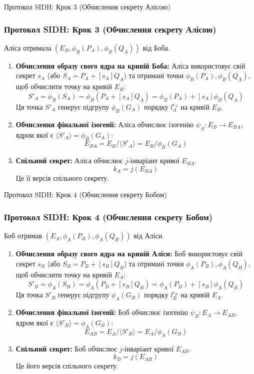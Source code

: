 \documentclass[9pt]{beamer}
\begin{document}
\begin{darkframes}

\begin{frame}{Протокол SIDH: Крок 3 (Обчислення секрету Алісою)}
  \frametitle{Протокол SIDH: Крок 3 (Обчислення секрету Алісою)}
  Аліса отримала $(E_B, \phi_B(P_A), \phi_B(Q_A))$ від Боба.
  \begin{enumerate}
    \item \textbf{Обчислення образу свого ядра на кривій Боба:} Аліса використовує свій секрет $s_A$ (або $S_A = P_A + [s_A] Q_A$) та отримані точки $\phi_B(P_A), \phi_B(Q_A)$, щоб обчислити точку на кривій $E_B$:
    $$ S'_A = \phi_B(S_A) = \phi_B(P_A + [s_A] Q_A) = \phi_B(P_A) + [s_A] \phi_B(Q_A) $$
    Ця точка $S'_A$ генерує підгрупу $\phi_B(G_A)$ порядку $l_A^{e_A}$ на кривій $E_B$.
    \item \textbf{Обчислення фінальної ізогенії:} Аліса обчислює ізогенію $\psi_A: E_B \to E_{BA}$, ядром якої є $\langle S'_A \rangle = \phi_B(G_A)$:
    $$ E_{BA} = E_B / \langle S'_A \rangle = E_B / \phi_B(G_A) $$
    \item \textbf{Спільний секрет:} Аліса обчислює $j$-інваріант кривої $E_{BA}$.
    $$ k_A = j(E_{BA}) $$
    Це її версія спільного секрету.
  \end{enumerate}
\end{frame}


\begin{frame}{Протокол SIDH: Крок 4 (Обчислення секрету Бобом)}
  \frametitle{Протокол SIDH: Крок 4 (Обчислення секрету Бобом)}
  Боб отримав $(E_A, \phi_A(P_B), \phi_A(Q_B))$ від Аліси.
  \begin{enumerate}
    \item \textbf{Обчислення образу свого ядра на кривій Аліси:} Боб використовує свій секрет $s_B$ (або $S_B = P_B + [s_B] Q_B$) та отримані точки $\phi_A(P_B), \phi_A(Q_B)$, щоб обчислити точку на кривій $E_A$:
    $$ S'_B = \phi_A(S_B) = \phi_A(P_B + [s_B] Q_B) = \phi_A(P_B) + [s_B] \phi_A(Q_B) $$
    Ця точка $S'_B$ генерує підгрупу $\phi_A(G_B)$ порядку $l_B^{e_B}$ на кривій $E_A$.
    \item \textbf{Обчислення фінальної ізогенії:} Боб обчислює ізогенію $\psi_B: E_A \to E_{AB}$, ядром якої є $\langle S'_B \rangle = \phi_A(G_B)$:
    $$ E_{AB} = E_A / \langle S'_B \rangle = E_A / \phi_A(G_B) $$
    \item \textbf{Спільний секрет:} Боб обчислює $j$-інваріант кривої $E_{AB}$.
    $$ k_B = j(E_{AB}) $$
    Це його версія спільного секрету.
  \end{enumerate}
\end{frame}


\end{darkframes}
\end{document}
